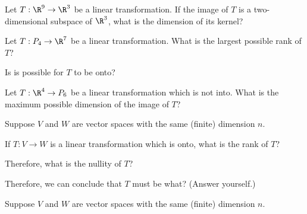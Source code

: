 
Let $T: \R^9 \rightarrow \R^3$ be a linear transformation.  If the image of $T$ is a two-dimensional 
subspace of $\R^3$, what is the dimension of its kernel?



\edXsolution{
}

\endedxproblem


Let $T: P_4 \rightarrow \R^7$ be a linear transformation.  What is the largest possible rank of $T$?


Is is possible for $T$ to be onto?  



\edXsolution{
}

\endedxproblem



Let $T: \R^4 \rightarrow P_6$ be a linear transformation which is not into.  What is the maximum possible
dimension of the image of $T$?    



\edXsolution{
}

\endedxproblem



Suppose $V$ and $W$ are vector spaces with the same (finite) dimension $n$.  

If $T: V\rightarrow W$ is a linear transformation which is onto, what is the rank of $T$?  



Therefore, what is the nullity of $T$?  


Therefore, we can conclude that $T$ must be what?  (Answer yourself.)  

\edXsolution{
}

\endedxproblem



Suppose $V$ and $W$ are vector spaces with the same (finite) dimension $n$.  

